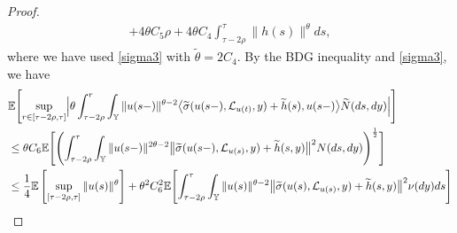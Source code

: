 \documentclass[11pt]{article}
\numberwithin{equation}{section}
\theoremstyle{plain}
\begin{document}
\begin{proof}
\begin{align}
 	+ 4 \theta C_5
 	  \rho
 	+ 4 \theta C_4
 	\int_{\tau - 2\rho}^{\tau}
 	\|h(s)\|^{\theta} ds,
 \end{align}
 where we have used
 \eqref{sigma3}
 with  $\tilde{\theta} = 2C_4$.
By the BDG inequality
and  \eqref{sigma3}, we have
\begin{align}\label{pue-10}
	& \mathbb{E}\Biggl[
	\sup_{r \in [\tau - 2\rho,\tau]}
	\Bigl|
	\theta 
	 \int_{\tau - 2\rho}^{r} \int_{
	 \mathbb{Y}
	 } 
	\|u(s-)\|^{\theta-2}
	\big\langle
	\widetilde{\sigma}(u(s-),\mathcal{L}_{u(t)}, y) 
	+ \widetilde{h}(s),
	u(s-)
	\big\rangle 
	\widetilde{N}(ds,dy)
	\Bigr|
	\Biggr]
	\nonumber \\
	&\le
	\theta C_{6 }
	\mathbb{E}\Biggl[
	\Biggl(
	\int_{\tau - 2\rho}^{\tau} \int_{
	 \mathbb{Y}
	} 
	\|u(s-)\|^{2\theta-2}
	\bigl\|
	\widetilde{\sigma}(u(s-),\mathcal{L}_{u(s)}, y) 
	+ \widetilde{h}(s,y)
	\bigr\|^{2}
	N(ds, dy)
	\Biggr)^{\frac{1}{2}}
	\Biggr]
	\nonumber \\
	&   
	\le \frac{1}{4} 
	          \mathbb{E}
	            \left[\sup_{[\tau - 2\rho, \tau]} \|u(s)\|^\theta
	            \right]
	     + \theta^2 C_6^2
	                \mathbb{E}
	                       \Biggl[ \int_{\tau - 2\rho}^{\tau} 
	                                       \int_{ \mathbb{Y} } 
	                                                 \|u(s)\|^{\theta-2}
	                                                 \bigl\| \widetilde{\sigma}(u(s),\mathcal{L}_{u(s)}, y) 
	                                                                + \widetilde{h}(s,y)
                                                   	 \bigr\|^{2}
	                                        \nu(dy) ds
	                      \Biggr]   
	\nonumber \\	

\end{align}
\end{proof}
\end{document}
